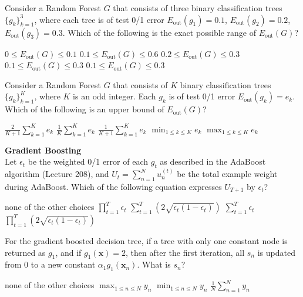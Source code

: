 \documentclass[a4paper,10pt]{exam}
\begin{document}
\begin{questions}
		\question Consider a Random Forest $G$ that consists of three binary classification trees $\{g_k\}_{k=1}^3$, where each tree is of test 0/1 error $E_{\text{out}}(g_1) = 0.1$, $E_{\text{out}}(g_2) = 0.2$, $E_{\text{out}}(g_3) = 0.3$. Which of the following is the exact possible range of $E_{\text{out}}(G)$?
		\begin{choices}
			\choice $0 \le E_{\text{out}}(G) \le 0.1$
			\choice $0.1 \le E_{\text{out}}(G) \le 0.6$
			\choice $0.2 \le E_{\text{out}}(G) \le 0.3$
			\choice $0.1 \le E_{\text{out}}(G) \le 0.3$
			\CorrectChoice $0.1 \le E_{\text{out}}(G) \le 0.3$\\
		\end{choices}
		
		\question Consider a Random Forest $G$ that consists of $K$ binary classification trees $\{g_k\}_{k=1}^K$, where $K$ is an odd integer. Each $g_k$ is of test 0/1 error $E_{\text{out}}(g_k) = e_k$. Which of the following is an upper bound of $E_{\text{out}}(G)$?
		\begin{choices}
			\CorrectChoice $\frac{2}{K+1} \sum_{k=1}^K e_k$
			\choice $\frac{1}{K} \sum_{k=1}^K e_k$
			\choice $\frac{1}{K+1} \sum_{k=1}^K e_k$
			\choice $\min_{1 \le k \le K} e_k$
			\choice $\max_{1 \le k \le K} e_k$\\
		\end{choices}
		
		\question \textbf{Gradient Boosting}\\
		Let $\epsilon_t$ be the weighted 0/1 error of each $g_t$ as described in the AdaBoost algorithm (Lecture 208), and $U_t = \sum_{n=1}^N u_n^{(t)}$ be the total example weight during AdaBoost. Which of the following equation expresses $U_{T+1}$ by $\epsilon_t$?
		\begin{choices}
			\choice none of the other choices
			\choice $\prod_{t=1}^T \epsilon_t$
			\choice $\sum_{t=1}^T (2 \sqrt{\epsilon_t(1-\epsilon_t)})$
			\choice $\sum_{t=1}^T \epsilon_t$
			\CorrectChoice $\prod_{t=1}^T (2 \sqrt{\epsilon_t(1-\epsilon_t)})$\\
		\end{choices}
		
		\question For the gradient boosted decision tree, if a tree with only one constant node is returned as $g_1$, and if $g_1(\mathbf{x}) = 2$, then after the first iteration, all $s_n$ is updated from $0$ to a new constant $\alpha_1 g_1(\mathbf{x}_n)$. What is $s_n$?
		
		\begin{choices}
			\choice 2
			\choice none of the other choices
			\choice $\max_{1 \le n \le N} y_n$
			\choice $\min_{1 \le n \le N} y_n$
			\CorrectChoice $\frac{1}{N} \sum_{n=1}^N y_n$\\
		\end{choices}
		

\end{questions}
\end{document}
